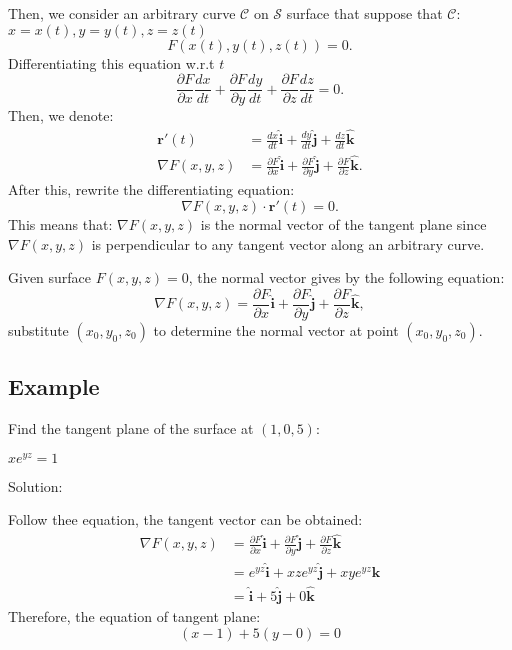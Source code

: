 Then, we consider an arbitrary curve $\mathcal{C}$ on $\mathcal{S}$ surface that suppose that $\mathcal{C}$: $x=x(t),y=y(t),z=z(t)$
\[
F(x(t),y(t),z(t))=0.
\]
Differentiating this equation w.r.t $t$
\begin{equation}
\frac{\partial F}{\partial x}\frac{dx}{dt}+\frac{\partial F}{\partial y}\frac{dy}{dt}+\frac{\partial F}{\partial z}\frac{dz}{dt}=0.
\end{equation}
Then, we denote:
\begin{align*}
\mathbf{r}'(t)&=\frac{dx}{dt}\mathbf{\hat{i}}+\frac{dy}{dt}\mathbf{\hat{j}}+\frac{dz}{dt}\mathbf{\hat{k}}\\
\nabla F(x,y,z)&=\frac{\partial F}{\partial x}\mathbf{\hat{i}}+\frac{\partial F}{\partial y}\mathbf{\hat{j}}+\frac{\partial F}{\partial z}\mathbf{\hat{k}}.
\end{align*}
After this, rewrite the differentiating equation:
\begin{equation}
\boxed{
\nabla F(x,y,z)\cdot \mathbf{r}'(t)=0.
}
\end{equation}
This means that: $\nabla F(x,y,z)$ is the normal vector of the tangent plane since $\nabla F(x,y,z)$ is perpendicular to any tangent vector along an arbitrary curve.

Given surface $F(x,y,z)=0$,
the normal vector gives by the following equation:
\begin{equation}
\boxed{
\nabla F(x,y,z)=\frac{\partial F}{\partial x}\mathbf{\hat{i}}+\frac{\partial F}{\partial y}\mathbf{\hat{j}}+\frac{\partial F}{\partial z}\mathbf{\hat{k}},
}
\end{equation}
substitute $(x_0,y_0,z_0)$ to determine the normal vector at point $(x_0,y_0,z_0)$.

\subsection{Example}
Find the tangent plane of the surface at $(1,0,5)$:
\begin{center}
$xe^{yz}=1$
\end{center}

Solution:

Follow thee equation,
the tangent vector can be obtained:
\begin{align*}
\nabla F(x,y,z)&=\frac{\partial F}{\partial x}\mathbf{\hat{i}} + \frac{\partial F}{\partial y}\mathbf{\hat{j}}+\frac{\partial F}{\partial z}\mathbf{\hat{k}}	\\
&= e^{yz}\mathbf{\hat{i}}+xze^{yz}\mathbf{\hat{j}}+xye^{yz}\mathbf{\hat{k}}\\
&= \mathbf{\hat{i}}+5\mathbf{\hat{j}}+0\mathbf{\hat{k}}
\end{align*}
Therefore, the equation of tangent plane:
\[(x-1)+5(y-0)=0\]

